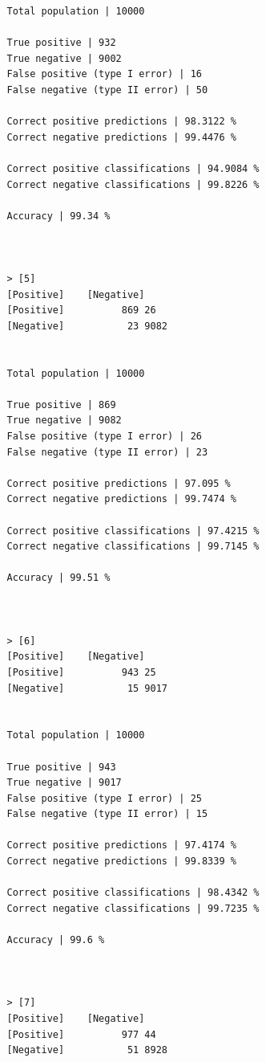 \documentclass{classrep}
\begin{document}
{{{\begin{lstlisting}
                Total population | 10000

                True positive | 932
                True negative | 9002
                False positive (type I error) | 16
                False negative (type II error) | 50

                Correct positive predictions | 98.3122 %
                Correct negative predictions | 99.4476 %

                Correct positive classifications | 94.9084 %
                Correct negative classifications | 99.8226 %

                Accuracy | 99.34 %



                > [5]
                [Positive]    [Negative]
                [Positive]          869 26
                [Negative]           23 9082


                Total population | 10000

                True positive | 869
                True negative | 9082
                False positive (type I error) | 26
                False negative (type II error) | 23

                Correct positive predictions | 97.095 %
                Correct negative predictions | 99.7474 %

                Correct positive classifications | 97.4215 %
                Correct negative classifications | 99.7145 %

                Accuracy | 99.51 %



                > [6]
                [Positive]    [Negative]
                [Positive]          943 25
                [Negative]           15 9017


                Total population | 10000

                True positive | 943
                True negative | 9017
                False positive (type I error) | 25
                False negative (type II error) | 15

                Correct positive predictions | 97.4174 %
                Correct negative predictions | 99.8339 %

                Correct positive classifications | 98.4342 %
                Correct negative classifications | 99.7235 %

                Accuracy | 99.6 %



                > [7]
                [Positive]    [Negative]
                [Positive]          977 44
                [Negative]           51 8928



\end{lstlisting}}}}
\end{document}
